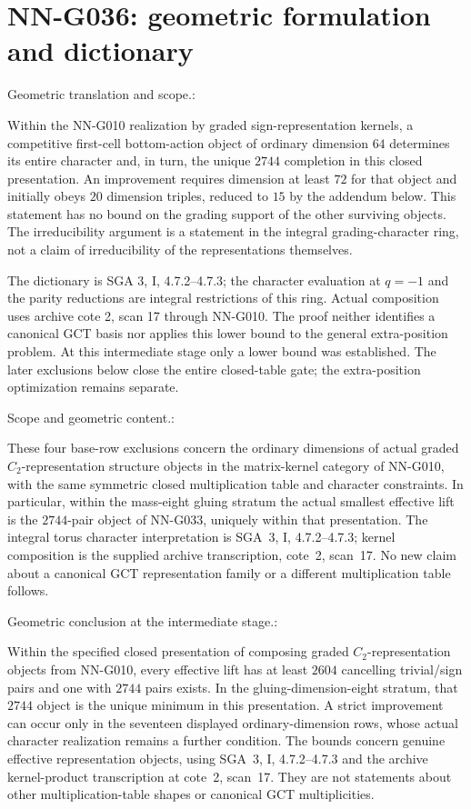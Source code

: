 \section{NN-G036: geometric formulation and dictionary}
\begin{geometricstatement}[NN-G036]
Geometric translation and scope.:

Within the NN-G010 realization by graded sign-representation
kernels, a competitive first-cell bottom-action object
of ordinary dimension $64$ determines its entire character
and, in turn, the unique $2744$ completion in this closed
presentation. An improvement requires dimension at least
$72$ for that object and initially obeys $20$
dimension triples, reduced to $15$ by the addendum below. This statement has no bound on the
grading support of the other surviving objects.
The irreducibility argument is a statement in the
integral grading-character ring, not a claim of
irreducibility of the representations themselves.

The dictionary is SGA 3, I, 4.7.2--4.7.3; the character
evaluation at $q=-1$ and the parity reductions are
integral restrictions of this ring. Actual composition
uses archive cote 2, scan 17 through NN-G010.
The proof neither identifies a canonical GCT basis nor
applies this lower bound to the general extra-position
problem. At this intermediate stage only a lower bound was established.
The later exclusions below close the entire closed-table gate;
the extra-position optimization remains separate.



Scope and geometric content.:

These four base-row exclusions concern the ordinary
dimensions of actual graded $C_2$-representation
structure objects in the matrix-kernel category of
NN-G010, with the same symmetric closed multiplication
table and character constraints. In particular, within
the mass-eight gluing stratum the actual smallest
effective lift is the $2744$-pair object of NN-G033,
uniquely within that presentation. The integral torus
character interpretation is SGA~3, I, 4.7.2--4.7.3;
kernel composition is the supplied archive transcription,
cote~2, scan~17. No new claim about a canonical GCT
representation family or a different multiplication
table follows.


Geometric conclusion at the intermediate stage.:

Within the specified closed presentation of composing graded
$C_2$-representation objects from NN-G010, every effective
lift has at least $2604$ cancelling trivial/sign pairs and
one with $2744$ pairs exists. In the gluing-dimension-eight
stratum, that $2744$ object is the unique minimum in this
presentation. A strict improvement can occur only in the
seventeen displayed ordinary-dimension rows, whose actual
character realization remains a further condition.
The bounds concern genuine effective representation objects,
using SGA~3, I, 4.7.2--4.7.3 and the archive kernel-product
transcription at cote~2, scan~17. They are not statements
about other multiplication-table shapes or canonical GCT
multiplicities.



\end{geometricstatement}
